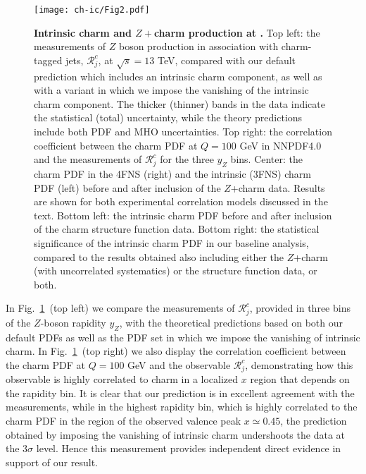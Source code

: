 \begin{figure}[htbp]
  \begin{center}
    \texttt{[image: ch-ic/Fig2.pdf]}
     \caption{\small
       \textbf{ Intrinsic charm and $Z+$charm production at \lhcb.}
       Top left: the \lhcb measurements of $Z$ boson production
      in association with charm-tagged jets, $\mathcal{R}_j^c$, at $\sqrt{s}=13$ TeV,  compared with
      our default prediction which includes an intrinsic charm component,
      as well as with a variant in which we impose the
      vanishing of the intrinsic charm component.
       The thicker (thinner) bands in the \lhcb data indicate the statistical
      (total) uncertainty, while the theory predictions include both PDF and MHO uncertainties.
      Top right: the correlation coefficient between
     the  charm PDF at $Q=100$ GeV in NNPDF4.0
      and the \lhcb measurements of $\mathcal{R}_j^c$ 
     for the three $y_Z$ bins.
     Center: the charm PDF
     in the 4FNS (right) and the intrinsic (3FNS) charm PDF (left)
     before and after inclusion of the \lhcb $Z$+charm data.
     Results are shown
     for both experimental correlation models discussed in the text.
     Bottom left: the intrinsic charm PDF before and after inclusion
     of the \emc charm structure function data.
     Bottom right: the statistical significance of the
     intrinsic charm PDF in our baseline analysis, compared to the results
     obtained also including either the \lhcb $Z$+charm (with uncorrelated
     systematics) or the \emc
     structure function data, or both.
  \label{fig:ic/Zc} }
\end{center}
\end{figure}

In Fig.~\ref{fig:ic/Zc}~(top left) we compare the \lhcb measurements of $\mathcal{R}_j^c$, provided
in three bins of the $Z$-boson rapidity
$y_Z$, with the theoretical predictions
 based on both our default PDFs as well as the PDF set in
 which we impose the vanishing of intrinsic charm.
 In Fig.~\ref{fig:ic/Zc}~(top right)
we also display the  correlation coefficient between
 the  charm PDF at $Q=100$ GeV 
 and the observable  $\mathcal{R}_j^c$, demonstrating how this observable
 is highly
 correlated to charm in a localized
 $x$ region that depends on the rapidity bin.
 It is clear that
 our prediction is in excellent agreement with the \lhcb measurements, while in the
 highest rapidity bin, which is highly correlated to the charm PDF in
 the region of the observed valence peak $x\simeq 0.45$, the prediction
 obtained by imposing the vanishing of intrinsic charm undershoots the
 data at the $3\sigma$ level.
%
 Hence this measurement provides
 independent direct evidence in support of our result.

